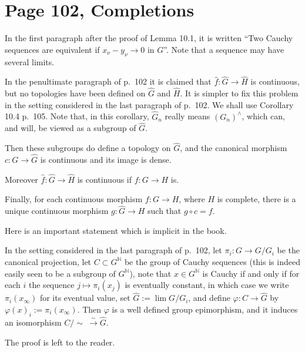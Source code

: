 \documentclass[12pt]{article}
\begin{document}
\section{Page 102, Completions}%

In the first paragraph after the proof of Lemma 10.1, it is written ``Two Cauchy sequences are equivalent if $x_\nu-y_\nu\to0$ in $G$''. Note that a sequence may have several limits.%

In the penultimate paragraph of p.~102 it is claimed that $\widehat f:\widehat G\to\widehat H$ is continuous, but no topologies have been defined on $\widehat G$ and $\widehat H$. It is simpler to fix this problem in the setting considered in the last paragraph of p.~102. We shall use Corollary 10.4 p.~105. Note that, in this corollary, $\widehat G_n$ really means $(G_n)^\wedge$, which can, and will, be viewed as a subgroup of $\widehat G$. 

Then these subgroups do define a topology on $\widehat G$, and the canonical morphism $c:G\to\widehat G$ is continuous and its image is dense. 

Moreover $\widehat f:\widehat G\to\widehat H$ is continuous if $f:G\to H$ is. 

Finally, for each continuous morphism $f:G\to H$, where $H$ is complete, there is a unique continuous morphism $g:\widehat G\to H$ such that $g\circ c=f$.

Here is an important statement which is implicit in the book.

In the setting considered in the last paragraph of p.~102, let $\pi_i:G\to G/G_i$ be the canonical projection, let $C\subset G^{\mathbb N}$ be the group of Cauchy sequences (this is indeed easily seen to be a subgroup of $G^{\mathbb N}$), note that $x\in G^{\mathbb N}$ is Cauchy if and only if for each $i$ the sequence $j\mapsto\pi_i(x_j)$ is eventually constant, in which case we write $\pi_i(x_\infty)$ for its eventual value, set $\widehat G:=\lim G/G_i$, and define $\varphi:C\to\widehat G$ by $\varphi(x)_i:=\pi_i(x_\infty)$. Then $\varphi$ is a well defined group epimorphism, and it induces an isomorphism $C/\!\!\sim\ \xrightarrow\sim\widehat G$.

The proof is left to the reader.%
\end{document}
